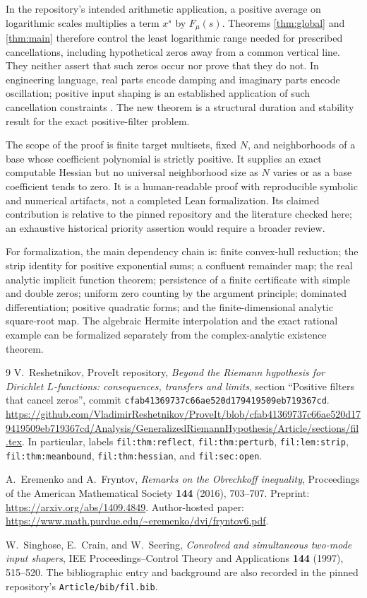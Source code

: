 \documentclass[11pt]{article}
\theoremstyle{remark}\newtheorem{remark}[theorem]{Remark}
\begin{document}
In the repository's intended arithmetic application, a positive average on
logarithmic scales multiplies a term $x^s$ by $F_\mu(s)$. Theorems
\ref{thm:global} and \ref{thm:main} therefore control the least logarithmic
range needed for prescribed cancellations, including hypothetical zeros
away from a common vertical line. They neither assert that such zeros occur
nor prove that they do not. In engineering language, real parts encode
damping and imaginary parts encode oscillation; positive input shaping is
an established application of such cancellation constraints
\cite{SinghoseCrainSeering}. The new theorem is a structural duration and
stability result for the exact positive-filter problem.

The scope of the proof is finite target multisets, fixed $N$, and
neighborhoods of a base whose coefficient polynomial is strictly positive.
It supplies an exact computable Hessian but no universal neighborhood size
as $N$ varies or as a base coefficient tends to zero. It is a human-readable
proof with reproducible symbolic and numerical artifacts, not a completed
Lean formalization. Its claimed contribution is relative to the pinned
repository and the literature checked here; an exhaustive historical
priority assertion would require a broader review.

For formalization, the main dependency chain is: finite convex-hull
reduction; the strip identity for positive exponential sums; a confluent
remainder map; the real analytic implicit function theorem; persistence of
a finite certificate with simple and double zeros; uniform zero counting
by the argument principle; dominated differentiation; positive quadratic
forms; and the finite-dimensional analytic square-root map. The algebraic
Hermite interpolation and the exact rational example can be formalized
separately from the complex-analytic existence theorem.

\begin{thebibliography}{9}
V.~Reshetnikov, ProveIt repository, \emph{Beyond the Riemann hypothesis for
Dirichlet $L$-functions: consequences, transfers and limits}, section
``Positive filters that cancel zeros'', commit
\texttt{cfab41369737c66ae520d179419509eb719367cd}.
\url{https://github.com/VladimirReshetnikov/ProveIt/blob/cfab41369737c66ae520d179419509eb719367cd/Analysis/GeneralizedRiemannHypothesis/Article/sections/fil.tex}.
In particular, labels \texttt{fil:thm:reflect}, \texttt{fil:thm:perturb},
\texttt{fil:lem:strip}, \texttt{fil:thm:meanbound},
\texttt{fil:thm:hessian}, and \texttt{fil:sec:open}.

A.~Eremenko and A.~Fryntov, \emph{Remarks on the Obrechkoff inequality},
Proceedings of the American Mathematical Society \textbf{144} (2016),
703--707. Preprint: \url{https://arxiv.org/abs/1409.4849}.
Author-hosted paper:
\url{https://www.math.purdue.edu/~eremenko/dvi/fryntov6.pdf}.

W.~Singhose, E.~Crain, and W.~Seering,
\emph{Convolved and simultaneous two-mode input shapers},
IEE Proceedings--Control Theory and Applications \textbf{144} (1997),
515--520. The bibliographic entry and background are also recorded in
the pinned repository's \texttt{Article/bib/fil.bib}.
\end{thebibliography}
\end{document}
